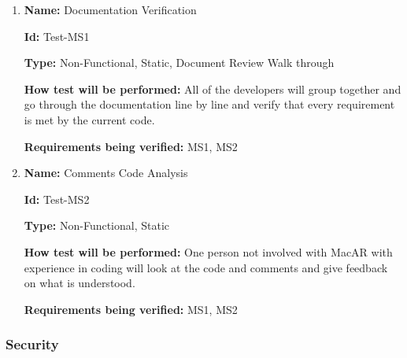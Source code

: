 \documentclass[12pt, titlepage]{article}
\begin{document}
\begin{enumerate}

\item{\textbf{Name:} Documentation Verification}

\textbf{Id:} Test-MS1

\textbf{Type:} Non-Functional, Static, Document Review Walk through
			
\textbf{How test will be performed:} All of the developers will group together and go through the documentation line by line and verify that every requirement is met by the current code.

\textbf{Requirements being verified:} MS1, MS2

\item{\textbf{Name:} Comments Code Analysis}

\textbf{Id:} Test-MS2

\textbf{Type:} Non-Functional, Static
					
\textbf{How test will be performed:} One person not involved with MacAR with experience in coding will look at the code and comments and give feedback on what is understood.

\textbf{Requirements being verified:} MS1, MS2

\end{enumerate}

\subsubsection{Security}
\end{document}
